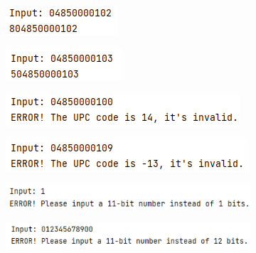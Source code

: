 \begin{figure}[H]
	\centering
	\begin{subfigure}{0.325\linewidth}
		\centering
		\includegraphics[width=0.7\linewidth]{../pic/1/1.1.png}
	\end{subfigure}
	\begin{subfigure}{0.325\linewidth}
		\centering
		\includegraphics[width=0.7\linewidth]{../pic/1/1.2.png}
	\end{subfigure}
	\begin{subfigure}{0.325\linewidth}
		\centering
		\includegraphics[width=1\linewidth]{../pic/1/1.3.png}
	\end{subfigure}
    \vspace{1cm}
    \begin{subfigure}{0.325\linewidth}
		\centering
		\includegraphics[width=1\linewidth]{../pic/1/1.4.png}
	\end{subfigure}
	\begin{subfigure}{0.325\linewidth}
		\centering
		\includegraphics[width=1\linewidth]{../pic/1/1.5.png}
	\end{subfigure}
	\begin{subfigure}{0.325\linewidth}
		\centering
		\includegraphics[width=1\linewidth]{../pic/1/1.6.png}

\end{subfigure}
\end{figure}
